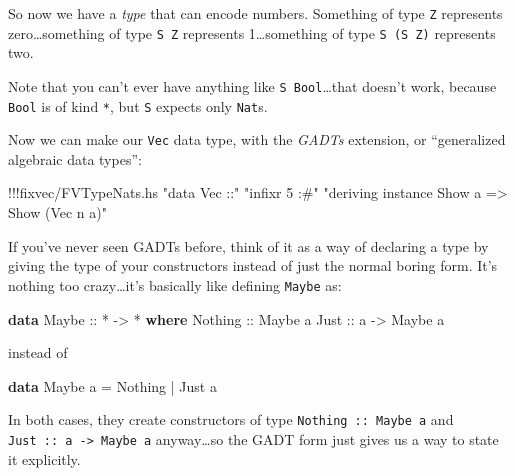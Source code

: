 \documentclass[]{article}
\newenvironment{Shaded}{}{}
\newcommand{\KeywordTok}[1]{\textcolor[rgb]{0.00,0.44,0.13}{\textbf{{#1}}}}
\newcommand{\DataTypeTok}[1]{\textcolor[rgb]{0.56,0.13,0.00}{{#1}}}
\newcommand{\StringTok}[1]{\textcolor[rgb]{0.25,0.44,0.63}{{#1}}}
\newcommand{\OtherTok}[1]{\textcolor[rgb]{0.00,0.44,0.13}{{#1}}}
\newcommand{\FunctionTok}[1]{\textcolor[rgb]{0.02,0.16,0.49}{{#1}}}
\newcommand{\NormalTok}[1]{{#1}}
\begin{document}
So now we have a \emph{type} that can encode numbers. Something of type
\texttt{Z} represents zero\ldots{}something of type \texttt{S\ Z}
represents 1\ldots{}something of type \texttt{S\ (S\ Z)} represents two.

Note that you can't ever have anything like \texttt{S\ Bool}\ldots{}that
doesn't work, because \texttt{Bool} is of kind \texttt{*}, but
\texttt{S} expects only \texttt{Nat}s.

Now we can make our \texttt{Vec} data type, with the \emph{GADTs}
extension, or ``generalized algebraic data types'':

\begin{Shaded}
\begin{Highlighting}[]
\FunctionTok{!!!}\NormalTok{fixvec}\FunctionTok{/}\NormalTok{FVTypeNats.hs }\StringTok{"data Vec ::"} \StringTok{"infixr 5 :#"} \StringTok{"deriving instance Show a => Show (Vec n a)"}
\end{Highlighting}
\end{Shaded}

If you've never seen GADTs before, think of it as a way of declaring a
type by giving the type of your constructors instead of just the normal
boring form. It's nothing too crazy\ldots{}it's basically like defining
\texttt{Maybe} as:

\begin{Shaded}
\begin{Highlighting}[]
\KeywordTok{data} \DataTypeTok{Maybe}\OtherTok{ ::} \FunctionTok{*} \OtherTok{->} \FunctionTok{*} \KeywordTok{where}
    \DataTypeTok{Nothing}\OtherTok{ ::} \DataTypeTok{Maybe} \NormalTok{a}
    \DataTypeTok{Just}\OtherTok{    ::} \NormalTok{a }\OtherTok{->} \DataTypeTok{Maybe} \NormalTok{a}
\end{Highlighting}
\end{Shaded}

instead of

\begin{Shaded}
\begin{Highlighting}[]
\KeywordTok{data} \DataTypeTok{Maybe} \NormalTok{a }\FunctionTok{=} \DataTypeTok{Nothing} \FunctionTok{|} \DataTypeTok{Just} \NormalTok{a}
\end{Highlighting}
\end{Shaded}

In both cases, they create constructors of type
\texttt{Nothing\ ::\ Maybe\ a} and
\texttt{Just\ ::\ a\ -\textgreater{}\ Maybe\ a} anyway\ldots{}so the
GADT form just gives us a way to state it explicitly.
\end{document}
